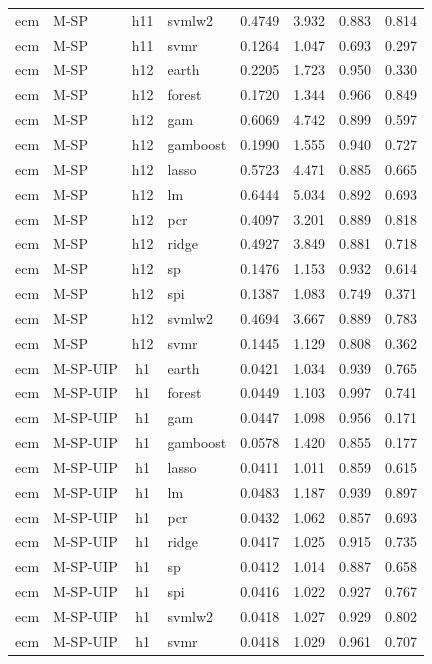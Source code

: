 \begin{ThreePartTable}
\begin{longtable}[t]{llclcccc}
ecm & M-SP & h11 & svmlw2 & 0.4749 & 3.932 & 0.883 & 0.814\\
ecm & M-SP & h11 & svmr & 0.1264 & 1.047 & 0.693 & 0.297\\
\addlinespace
ecm & M-SP & h12 & earth & 0.2205 & 1.723 & 0.950 & 0.330\\
ecm & M-SP & h12 & forest & 0.1720 & 1.344 & 0.966 & 0.849\\
ecm & M-SP & h12 & gam & 0.6069 & 4.742 & 0.899 & 0.597\\
ecm & M-SP & h12 & gamboost & 0.1990 & 1.555 & 0.940 & 0.727\\
ecm & M-SP & h12 & lasso & 0.5723 & 4.471 & 0.885 & 0.665\\
ecm & M-SP & h12 & lm & 0.6444 & 5.034 & 0.892 & 0.693\\
ecm & M-SP & h12 & pcr & 0.4097 & 3.201 & 0.889 & 0.818\\
ecm & M-SP & h12 & ridge & 0.4927 & 3.849 & 0.881 & 0.718\\
ecm & M-SP & h12 & sp & 0.1476 & 1.153 & 0.932 & 0.614\\
ecm & M-SP & h12 & spi & 0.1387 & 1.083 & 0.749 & 0.371\\
ecm & M-SP & h12 & svmlw2 & 0.4694 & 3.667 & 0.889 & 0.783\\
ecm & M-SP & h12 & svmr & 0.1445 & 1.129 & 0.808 & 0.362\\
\addlinespace
ecm & M-SP-UIP & h1 & earth & 0.0421 & 1.034 & 0.939 & 0.765\\
ecm & M-SP-UIP & h1 & forest & 0.0449 & 1.103 & 0.997 & 0.741\\
ecm & M-SP-UIP & h1 & gam & 0.0447 & 1.098 & 0.956 & 0.171\\
ecm & M-SP-UIP & h1 & gamboost & 0.0578 & 1.420 & 0.855 & 0.177\\
ecm & M-SP-UIP & h1 & lasso & 0.0411 & 1.011 & 0.859 & 0.615\\
ecm & M-SP-UIP & h1 & lm & 0.0483 & 1.187 & 0.939 & 0.897\\
ecm & M-SP-UIP & h1 & pcr & 0.0432 & 1.062 & 0.857 & 0.693\\
ecm & M-SP-UIP & h1 & ridge & 0.0417 & 1.025 & 0.915 & 0.735\\
ecm & M-SP-UIP & h1 & sp & 0.0412 & 1.014 & 0.887 & 0.658\\
ecm & M-SP-UIP & h1 & spi & 0.0416 & 1.022 & 0.927 & 0.767\\
ecm & M-SP-UIP & h1 & svmlw2 & 0.0418 & 1.027 & 0.929 & 0.802\\
ecm & M-SP-UIP & h1 & svmr & 0.0418 & 1.029 & 0.961 & 0.707\\

\end{longtable}
\end{ThreePartTable}
